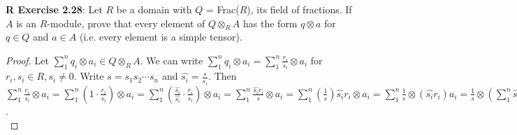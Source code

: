 \documentclass[8pt]{amsart}
\theoremstyle{plain}%
\theoremstyle{definition}
\theoremstyle{remark}
\numberwithin{equation}{section}
\begin{document}
\textbf{R Exercise 2.28}: Let $R$ be a domain with $Q$ = Frac($R$), its field of fractions. If $A$ is an $R$-module, prove that every element of $Q \otimes_RA$ has the form $q \otimes a$ for $q \in Q $ and $a \in A$ (i.e. every element is a simple tensor).
	\begin{proof}
		Let $\sum_1^n q_i \otimes a_i \in Q \otimes_RA$. We can write $\sum_1^n q_i \otimes a_i = \sum_1^n \frac{r_i}{s_i} \otimes a_i$ for $r_i,s_i \in R, s_i \neq 0$. Write $s=s_1s_2\cdots s_n$ and $\widehat{s_i}=\frac{s}{s_i}$. Then $\sum_1^n \frac{r_i}{s_i} \otimes a_i = \sum_1^n (1 \cdot \frac{r_i}{s_i}) \otimes a_i = \sum_1^n (\frac{\widehat{s_i}}{\widehat{s_i}} \cdot \frac{r_i}{s_i}) \otimes a_i = \sum_1^n \frac{\widehat{s_i}r_i}{s} \otimes a_i = \sum_1^n (\frac{1}{s})\widehat{s_i}r_i \otimes a_i = \sum_1^n \frac{1}{s} \otimes (\widehat{s_i}r_i)a_i = \frac{1}{s} \otimes (\sum_1^n \widehat{s_i}r_ia_i)$.\\
	\end{proof}
\end{document}
